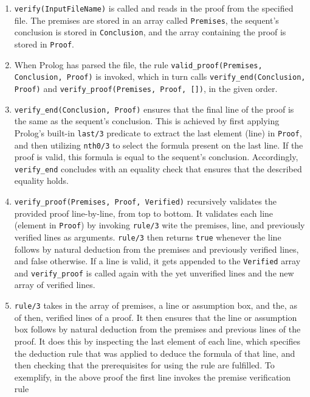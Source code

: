\documentclass[a4paper, 11pt]{article}
\begin{document}
   \begin{enumerate}
      \item \texttt{verify(InputFileName)} is called
            and reads in the proof from the specified file.
            The premises are stored in an array called
            \texttt{Premises}, the sequent's conclusion is
            stored in \texttt{Conclusion}, and the array
            containing the proof is stored in \texttt{Proof}.

      \item When Prolog has parsed the file, the rule
            \texttt{valid\_proof(Premises, Conclusion, Proof)}
            is invoked, which in turn calls
            \texttt{verify\_end(Conclusion, Proof)} and
            \texttt{verify\_proof(Premises, Proof, [])}, in
            the given order.

      \item \texttt{verify\_end(Conclusion, Proof)} ensures 
            that the final line of the proof is the same as
            the sequent's conclusion. This is achieved by
            first applying Prolog's built-in \texttt{last/3}
            predicate to extract the last element (line) in
            \texttt{Proof}, and then utilizing \texttt{nth0/3} 
            to select the formula present on the last line. If
            the proof is valid, this formula is equal to
            the sequent's conclusion. Accordingly, 
            \texttt{verify\_end} concludes with an equality
            check that ensures that the described equality
            holds.

      \item
         \texttt{verify\_proof(Premises, Proof, Verified)}
         recursively validates the provided proof
         line-by-line, from top to bottom. It validates each 
         line (element in \texttt{Proof}) by invoking 
         \texttt{rule/3} wite the premises, line, and 
         previously verified lines as arguments. 
         \texttt{rule/3} then returns \texttt{true} whenever 
         the line follows by natural deduction from the 
         premises and previously verified lines, and false
         otherwise. If a line is valid, it gets appended to
         the \texttt{Verified} array and \texttt{verify\_proof}
         is called again with the yet unverified lines and
         the new array of verified lines.

      \item \texttt{rule/3} takes in the array of premises, a
            line or assumption box, and the, as of then, 
            verified lines of a proof. It then ensures that
            the line or assumption box follows by natural
            deduction from the premises and previous lines of
            the proof. It does this by inspecting the last
            element of each line, which specifies the
            deduction rule that was applied to deduce the
            formula of that line, and then checking that the
            prerequisites for using the rule are fulfilled.
            To exemplify, in the above proof the first line
            invokes the premise verification rule


\end{enumerate}
\end{document}

